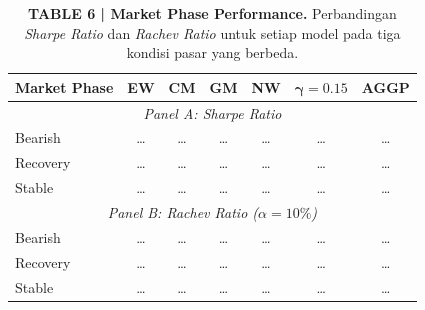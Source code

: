 \documentclass[12pt,a4paper]{article}
\begin{document}
\begin{table}[h!]
    \centering
    \footnotesize
    \setlength{\tabcolsep}{5pt}
    \caption{\textbf{TABLE 6 | Market Phase Performance.} Perbandingan \textit{Sharpe Ratio} dan \textit{Rachev Ratio} untuk setiap model pada tiga kondisi pasar yang berbeda.}
    \begin{tabular}{lcccccc}
        \toprule
        \textbf{Market Phase} & \textbf{EW} & \textbf{CM} & \textbf{GM} & \textbf{NW} & $\boldsymbol{\gamma=0.15}$ & \textbf{AGGP} \\
        \midrule
        \multicolumn{7}{c}{\textit{Panel A: Sharpe Ratio}} \\
        \midrule
        Bearish  & \ldots & \ldots & \ldots & \ldots & \ldots & \ldots \\
        Recovery & \ldots & \ldots & \ldots & \ldots & \ldots & \ldots \\
        Stable   & \ldots & \ldots & \ldots & \ldots & \ldots & \ldots \\
        \midrule
        \multicolumn{7}{c}{\textit{Panel B: Rachev Ratio ($\alpha=10\%$)}} \\
        \midrule
        Bearish  & \ldots & \ldots & \ldots & \ldots & \ldots & \ldots \\
        Recovery & \ldots & \ldots & \ldots & \ldots & \ldots & \ldots \\
        Stable   & \ldots & \ldots & \ldots & \ldots & \ldots & \ldots \\
        \bottomrule
    \end{tabular}
\end{table}
\end{document}

